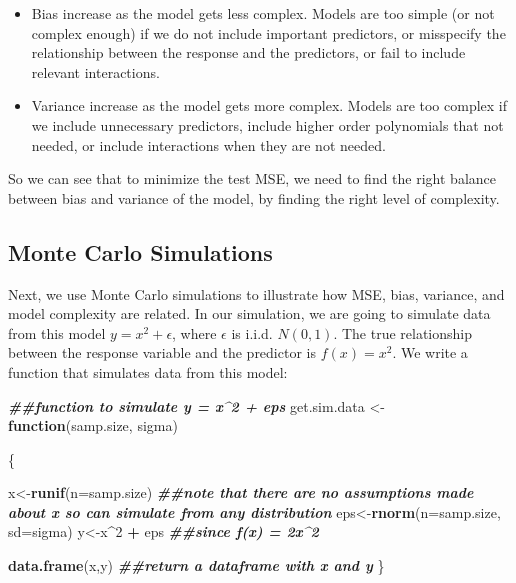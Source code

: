 \documentclass[
]{book}
\newenvironment{Shaded}{\begin{snugshade}}{\end{snugshade}}
\newcommand{\AttributeTok}[1]{\textcolor[rgb]{0.13,0.29,0.53}{#1}}
\newcommand{\ControlFlowTok}[1]{\textcolor[rgb]{0.13,0.29,0.53}{\textbf{#1}}}
\newcommand{\DecValTok}[1]{\textcolor[rgb]{0.00,0.00,0.81}{#1}}
\newcommand{\DocumentationTok}[1]{\textcolor[rgb]{0.56,0.35,0.01}{\textbf{\textit{#1}}}}
\newcommand{\FunctionTok}[1]{\textcolor[rgb]{0.13,0.29,0.53}{\textbf{#1}}}
\newcommand{\NormalTok}[1]{#1}
\newcommand{\OtherTok}[1]{\textcolor[rgb]{0.56,0.35,0.01}{#1}}
\newcommand{\SpecialCharTok}[1]{\textcolor[rgb]{0.81,0.36,0.00}{\textbf{#1}}}
\begin{document}
\begin{itemize}
\item
  Bias increase as the model gets less complex. Models are too simple (or not complex enough) if we do not include important predictors, or misspecify the relationship between the response and the predictors, or fail to include relevant interactions.
\item
  Variance increase as the model gets more complex. Models are too complex if we include unnecessary predictors, include higher order polynomials that not needed, or include interactions when they are not needed.
\end{itemize}

So we can see that to minimize the test MSE, we need to find the right balance between bias and variance of the model, by finding the right level of complexity.

\hypertarget{monte-carlo-simulations}{%
\subsection{Monte Carlo Simulations}\label{monte-carlo-simulations}}

Next, we use Monte Carlo simulations to illustrate how MSE, bias, variance, and model complexity are related. In our simulation, we are going to simulate data from this model \(y = x^2 + \epsilon\), where \(\epsilon\) is i.i.d. \(N(0,1)\). The true relationship between the response variable and the predictor is \(f(x) = x^2\). We write a function that simulates data from this model:

\begin{Shaded}
\begin{Highlighting}[]
\DocumentationTok{\#\#function to simulate y = x\^{}2 + eps}
\NormalTok{get.sim.data }\OtherTok{\textless{}{-}} \ControlFlowTok{function}\NormalTok{(samp.size, sigma)}
  
\NormalTok{\{}
  
\NormalTok{  x}\OtherTok{\textless{}{-}}\FunctionTok{runif}\NormalTok{(}\AttributeTok{n=}\NormalTok{samp.size) }\DocumentationTok{\#\#note that there are no assumptions made about x so can simulate from any distribution}
\NormalTok{  eps}\OtherTok{\textless{}{-}}\FunctionTok{rnorm}\NormalTok{(}\AttributeTok{n=}\NormalTok{samp.size, }\AttributeTok{sd=}\NormalTok{sigma)}
\NormalTok{  y}\OtherTok{\textless{}{-}}\NormalTok{x}\SpecialCharTok{\^{}}\DecValTok{2} \SpecialCharTok{+}\NormalTok{ eps }\DocumentationTok{\#\#since f(x) = 2x\^{}2}
  
  \FunctionTok{data.frame}\NormalTok{(x,y) }\DocumentationTok{\#\#return a dataframe with x and y}
\NormalTok{\}}
\end{Highlighting}
\end{Shaded}
\end{document}
